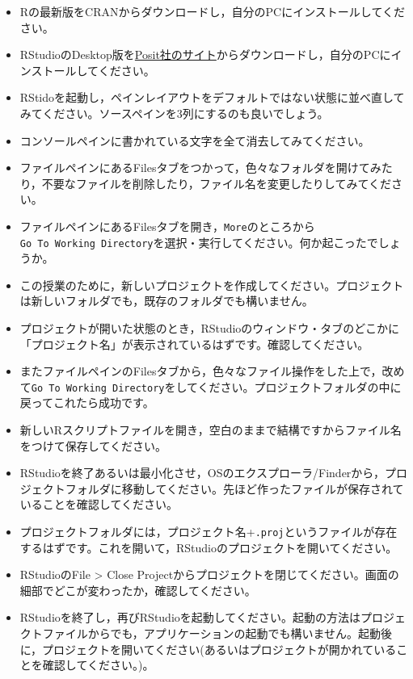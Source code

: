 \documentclass[
  a4paper,
]{ltjsbook}
\providecommand{\tightlist}{%
  \setlength{\itemsep}{0pt}\setlength{\parskip}{0pt}}\usepackage{longtable,booktabs,array}
\begin{document}
\begin{itemize}
\tightlist
\item
  Rの最新版をCRANからダウンロードし，自分のPCにインストールしてください。
\item
  RStudioのDesktop版を\href{https://posit.co/download/rstudio-desktop/}{Posit社のサイト}からダウンロードし，自分のPCにインストールしてください。
\item
  RStidoを起動し，ペインレイアウトをデフォルトではない状態に並べ直してみてください。ソースペインを3列にするのも良いでしょう。
\item
  コンソールペインに書かれている文字を全て消去してみてください。
\item
  ファイルペインにあるFilesタブをつかって，色々なフォルダを開けてみたり，不要なファイルを削除したり，ファイル名を変更したりしてみてください。
\item
  ファイルペインにあるFilesタブを開き，\texttt{More}のところから\texttt{Go\ To\ Working\ Directory}を選択・実行してください。何か起こったでしょうか。
\item
  この授業のために，新しいプロジェクトを作成してください。プロジェクトは新しいフォルダでも，既存のフォルダでも構いません。
\item
  プロジェクトが開いた状態のとき，RStudioのウィンドウ・タブのどこかに「プロジェクト名」が表示されているはずです。確認してください。
\item
  またファイルペインのFilesタブから，色々なファイル操作をした上で，改めて\texttt{Go\ To\ Working\ Directory}をしてください。プロジェクトフォルダの中に戻ってこれたら成功です。
\item
  新しいRスクリプトファイルを開き，空白のままで結構ですからファイル名をつけて保存してください。
\item
  RStudioを終了あるいは最小化させ，OSのエクスプローラ/Finderから，プロジェクトフォルダに移動してください。先ほど作ったファイルが保存されていることを確認してください。
\item
  プロジェクトフォルダには，プロジェクト名+\texttt{.proj}というファイルが存在するはずです。これを開いて，RStudioのプロジェクトを開いてください。
\item
  RStudioのFile \textgreater{} Close
  Projectからプロジェクトを閉じてください。画面の細部でどこが変わったか，確認してください。
\item
  RStudioを終了し，再びRStudioを起動してください。起動の方法はプロジェクトファイルからでも，アプリケーションの起動でも構いません。起動後に，プロジェクトを開いてください(あるいはプロジェクトが開かれていることを確認してください。)。
\end{itemize}
\end{document}
